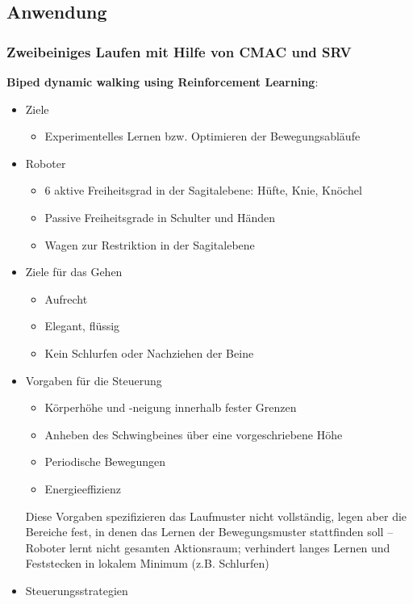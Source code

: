 \subsection{Anwendung}


\subsubsection{Zweibeiniges Laufen mit Hilfe von CMAC und SRV}

\textbf{Biped dynamic walking using Reinforcement Learning}:\\
\begin{itemize}
	\item Ziele
	\begin{itemize}
		\item Experimentelles Lernen bzw. Optimieren der Bewegungsabläufe	
	\end{itemize}
	\item Roboter
	\begin{itemize}
		\item 6 aktive Freiheitsgrad in der Sagitalebene: Hüfte, Knie, Knöchel
		\item Passive Freiheitsgrade in Schulter und Händen
		\item Wagen zur Restriktion in der Sagitalebene
	\end{itemize}
	\item Ziele für das Gehen
	\begin{itemize}
		\item Aufrecht
		\item Elegant, flüssig
		\item Kein Schlurfen oder Nachziehen der Beine
	\end{itemize}
	\item Vorgaben für die Steuerung
	\begin{itemize}
		\item Körperhöhe und -neigung innerhalb fester Grenzen
		\item Anheben des Schwingbeines über eine vorgeschriebene Höhe
		\item Periodische Bewegungen
		\item Energieeffizienz
	\end{itemize}
	Diese Vorgaben spezifizieren das Laufmuster nicht vollständig, legen aber die Bereiche fest, in denen das Lernen der Bewegungsmuster stattfinden soll -- Roboter lernt nicht gesamten Aktionsraum; 		verhindert langes Lernen und Feststecken in lokalem Minimum (z.B. \glqq Schlurfen\grqq)
	\item Steuerungsstrategien

\end{itemize}

